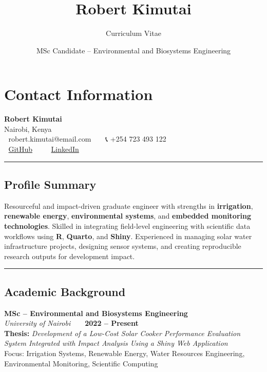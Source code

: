 \documentclass[
  11pt,
]{article}
\title{Robert Kimutai}
\subtitle{Curriculum Vitae}
\author{MSc Candidate -- Environmental and Biosystems Engineering}
\date{}
\begin{document}
\maketitle


\section{Contact Information}\label{contact-information}

\textbf{Robert Kimutai}\\
Nairobi, Kenya\\
📧 robert.kimutai@email.com \textbar{} 📞 +254 723 493 122\\
🔗 \href{https://github.com/robertkimutai}{GitHub} \textbar{} 🔗
\href{https://linkedin.com/in/robertkimutai}{LinkedIn}

\begin{center}\rule{0.5\linewidth}{0.5pt}\end{center}

\subsection{Profile Summary}\label{profile-summary}

Resourceful and impact-driven graduate engineer with strengths in
\textbf{irrigation}, \textbf{renewable energy}, \textbf{environmental
systems}, and \textbf{embedded monitoring technologies}. Skilled in
integrating field-level engineering with scientific data workflows using
\textbf{R}, \textbf{Quarto}, and \textbf{Shiny}. Experienced in managing
solar water infrastructure projects, designing sensor systems, and
creating reproducible research outputs for development impact.

\begin{center}\rule{0.5\linewidth}{0.5pt}\end{center}

\subsection{Academic Background}\label{academic-background}

\textbf{MSc -- Environmental and Biosystems Engineering}\\
\emph{University of Nairobi} \textbar{} \textbf{2022 -- Present}\\
\textbf{Thesis:} \emph{Development of a Low-Cost Solar Cooker
Performance Evaluation System Integrated with Impact Analysis Using a
Shiny Web Application}\\
Focus: Irrigation Systems, Renewable Energy, Water Resources
Engineering, Environmental Monitoring, Scientific Computing
\end{document}
